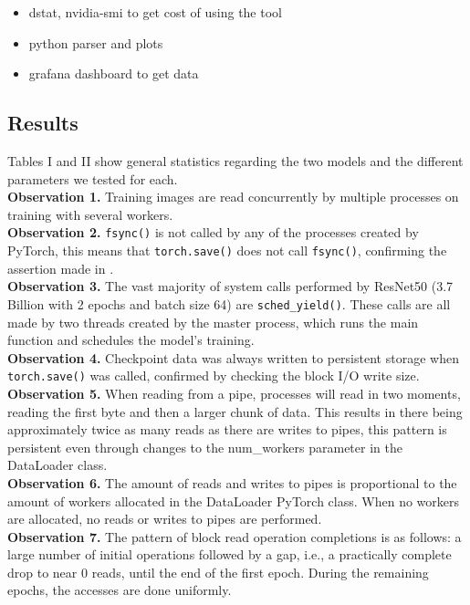 \documentclass[conference]{IEEEtran}
\begin{document}
\begin{itemize}
	\item dstat, nvidia-smi to get cost of using the tool
	\item python parser and plots
	\item grafana dashboard to get data
\end{itemize}

\subsection{Results}

Tables I and II show general statistics regarding the two models and the different parameters we tested for each.
\\
\textbf{Observation 1.} Training images are read concurrently by multiple processes on training with several workers.
\\
\textbf{Observation 2.} \texttt{fsync()} is not called by any of the processes created by PyTorch, this means that \texttt{torch.save()} does not call \texttt{fsync()}, confirming the assertion made in \cite{checkfreq}.
\\
\textbf{Observation 3.} The vast majority of system calls performed by ResNet50 (3.7 Billion with 2 epochs and batch size 64) are \texttt{sched\_yield()}. These calls are all made by two threads created by the master process, which runs the main function and schedules the model's training.
\\
\textbf{Observation 4.} Checkpoint data was always written to persistent storage when \texttt{torch.save()} was called, confirmed by checking the block I/O write size.
\\
\textbf{Observation 5.} When reading from a pipe, processes will read in two moments, reading the first byte and then a larger chunk of data. This results in there being approximately twice as many reads as there are writes to pipes, this pattern is persistent even through changes to the num\_workers parameter in the DataLoader class.
\\
\textbf{Observation 6.} The amount of reads and writes to pipes is proportional to the amount of workers allocated in the DataLoader PyTorch class. When no workers are allocated, no reads or writes to pipes are performed.
\\
\textbf{Observation 7.} The pattern of block read operation completions is as follows: a large number of initial operations followed by a gap, i.e., a practically complete drop to near 0 reads, until the end of the first epoch. During the remaining epochs, the accesses are done uniformly.
\end{document}
